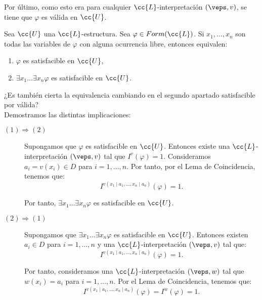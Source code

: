 \begin{ejercicio}
\begin{description}
        Por último, como esto era para cualquier $\cc{L}$-interpretación $(\veps,v)$, se tiene que $\varphi$ es válida en $\cc{U}$.
    \end{description}
\end{ejercicio}


\begin{ejercicio}\label{ej:2.5}
    Sea $\cc{U}$ una $\cc{L}$-estructura. Sea $\varphi \in Form(\cc{L})$. Si $x_1, \ldots, x_n$ son todas las variables de $\varphi$ con alguna ocurrencia libre, entonces equivalen:
    \begin{enumerate}
        \item $\varphi$ es satisfacible en $\cc{U}$,
        \item $\exists x_1 \ldots \exists x_n \varphi$ es satisfacible en $\cc{U}$.
    \end{enumerate}
    ¿Es también cierta la equivalencia cambiando en el segundo apartado satisfacible por válida?\\

    Demostramos las distintas implicaciones:
    \begin{description}
        \item[$(1)\Longrightarrow(2)$] Supongamos que $\varphi$ es satisfacible en $\cc{U}$. Entonces existe una $\cc{L}$-interpretación $(\veps,v)$ tal que $I^v(\varphi) = 1$. Consideramos $a_i=v(x_i)\in D$ para $i=1,\ldots,n$. Por tanto, por el Lema de Coincidencia, tenemos que:
        \begin{equation*}
            I^{v(x_1\mid a_1,\ldots,x_n\mid a_n)}(\varphi) = 1.
        \end{equation*}

        Por tanto, $\exists x_1 \ldots \exists x_n \varphi$ es satisfacible en $\cc{U}$.

        \item[$(2)\Longrightarrow(1)$] Supongamos que $\exists x_1 \ldots \exists x_n \varphi$ es satisfacible en $\cc{U}$. Entonces existen $a_i\in D$ para $i=1,\ldots,n$ y una $\cc{L}$-interpretación $(\veps,v)$ tal que:
        \begin{equation*}
            I^{v(x_1\mid a_1,\ldots,x_n\mid a_n)}(\varphi) = 1.
        \end{equation*}

        Por tanto, consideramos una $\cc{L}$-interpretación $(\veps,w)$ tal que $w(x_i) = a_i$ para $i=1,\ldots,n$. Por el Lema de Coincidencia, tenemos que:
        \begin{equation*}
            I^{v(x_1\mid a_1,\ldots,x_n\mid a_n)}(\varphi) = I^w(\varphi) = 1.
        \end{equation*}


\end{description}
\end{ejercicio}
